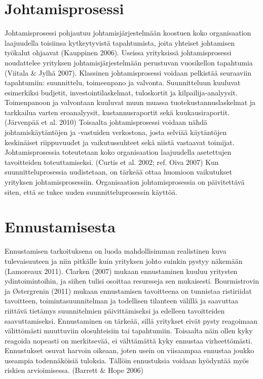 \documentclass[12pt,a4paper,oneside,pdftex]{report}
\begin{document}
\section{Johtamisprosessi}

Johtamisprosessi pohjautuu johtamisjärjestelmään koostuen koko organisaation laajuudella toisiinsa kytkeytyvistä tapahtumista, joita yhteiset johtamisen työkalut ohjaavat (Kauppinen 2006). Useissa yrityksissä johtamisprosessi noudattelee yrityksen johtamisjärjestelmään perustuvan vuosikellon tapahtumia (Viitala & Jylhä 2007). Klassinen johtamisprosessi voidaan pelkistää seuraaviin tapahtumiin: suunnittelu, toimeenpano ja valvonta. Suunnitteluun kuuluvat esimerkiksi budjetit, investointilaskelmat, tuloskortit ja kilpailija-analyysit. Toimenpanoon ja valvontaan kuuluvat muun muassa tuotekustannuslaskelmat ja tarkkailua varten eroanalyysit, kustannusraportit sekä kuukausiraportit. (Järvenpää et al. 2010) Toisaalta johtamisprosessi voidaan nähdä johtamiskäytäntöjen ja -vastuiden verkostona, josta selviää käytäntöjen keskinäiset riippuvuudet ja vaikutussuhteet sekä niistä vastaavat toimijat. Johtamisprosessia toteutetaan koko organisaation laajuudella asetettujen tavoitteiden toteuttamiseksi. (Curtis et al. 2002; ref. Oiva 2007) Kun suunnitteluprosessia uudistetaan, on tärkeää ottaa huomioon vaikutukset yrityksen johtamisprosessiin. Organisaation johtamisprosessia on päivitettävä siten, että se tukee uuden suunnitteluprosessin käyttöä.

\section{Ennustamisesta}

Ennustamisen tarkoituksena on luoda mahdollisimman realistinen kuva tulevaisuuteen ja niin pitkälle kuin yrityksen johto suinkin pystyy näkemään (Lamoreaux 2011). Clarken (2007) mukaan ennustaminen kuuluu yritysten ydintoimintoihin, ja siihen tulisi osoittaa resursseja sen mukaisesti. Bourmistrovin ja Østergrenin (2011) mukaan ennustamisen tavoitteena on tunnistaa ristiriidat tavoitteen, toimintasuunnitelman ja todellisen tilanteen välillä ja saavuttaa riittävä tietämys suunnitelmien päivittämiseksi ja edelleen tavoitteiden saavuttamiseksi. Ennustaminen on tärkeää, sillä yritykset eivät pysty reagoimaan välittömästi muuttuviin olosuhteisiin tai tapahtumiin. Toisaalta näin ollen kyky reagoida nopeasti on merkitsevää, ei välttämättä kyky ennustaa virheettömästi. Ennustukset osuvat harvoin oikeaan, joten usein on viisaampaa ennustaa joukko useampia todennäköisiä tuloksia. Tällöin ennustuksia voidaan hyödyntää myös riskien arvioimisessa. (Barrett & Hope 2006)
\end{document}
